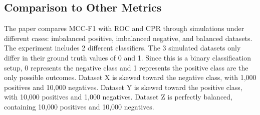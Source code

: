 \documentclass[12pt, oneside]{amsart}
\theoremstyle{definition}
\theoremstyle{remark}
\numberwithin{equation}{section}
\begin{document}
\subsection{Comparison to Other Metrics}
The paper compares MCC-F1 with ROC and CPR through simulations under different cases: imbalanced positive, imbalanced negative, and balanced datasets. The experiment includes 2 different classifiers.  The 3 simulated datasets only differ in their ground truth values of 0 and 1. Since this is a binary classification setup, 0 represents the negative class and 1 represents the positive class are the only possible outcomes. Dataset X is skewed toward the negative class, with 1,000 positives and 10,000 negatives. Dataset Y is skewed toward the positive class, with 10,000 positives and 1,000 negatives. Dataset Z is perfectly balanced, containing 10,000 positives and 10,000 negatives. \\
\end{document}
